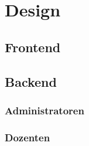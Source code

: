 \section{Design}
	\subsection{Frontend}
	\subsection{Backend}
		\subsubsection{Administratoren}
		\subsubsection{Dozenten}